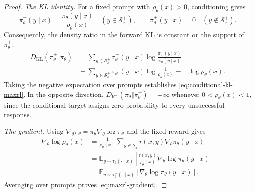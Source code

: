 \begin{proof}
\textit{The KL identity.}
For a fixed prompt with $\rho_\theta(x)>0$, conditioning gives
\begin{equation}
 \pi_\theta^+(y\mid x)
 =\frac{\pi_\theta(y\mid x)}{\rho_\theta(x)}
       \quad(y\in\mathcal S_x^+),
 \qquad \pi_\theta^+(y\mid x)=0
       \quad(y\notin\mathcal S_x^+).
 \label{eq:app-success-conditioning}
\end{equation}
Consequently, the density ratio in the forward KL is constant on the
support of $\pi_\theta^+$:
\begin{align}
 D_{\mathrm{KL}}(\pi_\theta^+\Vert\pi_\theta)
 &=\sum_{y\in\mathcal S_x^+}\pi_\theta^+(y\mid x)
             \log\frac{\pi_\theta^+(y\mid x)}{\pi_\theta(y\mid x)}
 \nonumber\\
 &=\sum_{y\in\mathcal S_x^+}\pi_\theta^+(y\mid x)
             \log\frac1{\rho_\theta(x)}
 =-\log\rho_\theta(x).
 \label{eq:app-success-kl}
\end{align}
Taking the negative expectation over prompts establishes
\eqref{eq:conditional-kl-maxrl}. In the opposite direction,
$D_{\mathrm{KL}}(\pi_\theta\Vert\pi_\theta^+)=+\infty$ whenever
$0<\rho_\theta(x)<1$, since the conditional target assigns zero
probability to every unsuccessful response.

\noindent\textit{The gradient.}
Using $\nabla_\theta\pi_\theta
=\pi_\theta\nabla_\theta\log\pi_\theta$ and the fixed reward gives
\begin{align}
 \nabla_\theta\log\rho_\theta(x)
 &=\frac1{\rho_\theta(x)}\sum_{y\in\mathcal Y_x}
                 r(x,y)\nabla_\theta\pi_\theta(y\mid x)
 \nonumber\\
 &=\mathbb E_{y\sim\pi_\theta(\cdot\mid x)}
       \left[\frac{r(x,y)}{\rho_\theta(x)}
                    \nabla_\theta\log\pi_\theta(y\mid x)\right]
 \nonumber\\
 &=\mathbb E_{y\sim\pi_\theta^+(\cdot\mid x)}
                    [\nabla_\theta\log\pi_\theta(y\mid x)].
 \label{eq:app-success-score}
\end{align}
Averaging over prompts proves \eqref{eq:maxrl-gradient}.
\end{proof}

